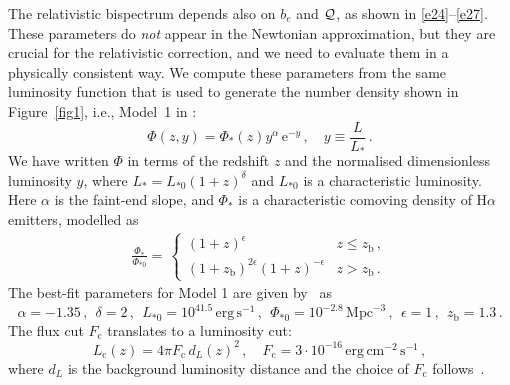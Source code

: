 The relativistic bispectrum depends also on $b_e$  and ${\cal Q}$, as shown in \eqref{e24}--\eqref{e27}.
These parameters do {\em not} appear in the Newtonian approximation, but they are crucial for the relativistic correction, and we need to evaluate them in a physically consistent way. We compute these parameters from the same luminosity function that is  used to generate the number density shown in Figure~\ref{fig1}, i.e., Model~1 in \cite{Pozzetti:2016cch}:
\begin{equation}
\Phi( z,y) = \Phi_{*}(z) y^\alpha\,{\mathrm{e}}^{-y}\,, \quad y\equiv \frac{L}{L_{*}}\,.
\label{e12_3}
\end{equation}
We have written $\Phi$ in terms of the redshift $z$ and the normalised dimensionless luminosity $y$, where $L_*=L_{*0}(1+z)^\delta$ and $L_{*0}$ is a characteristic luminosity. Here $\alpha$ is the faint-end slope, and $\Phi_{*}$ is a characteristic comoving density of H$\alpha$ emitters, modelled as 
\begin{align}\label{eq:comovinghamodel1}
\frac{\Phi_{*}}{\Phi_{*0}}= \,
\begin{cases} (1+z)^{\epsilon} &   z \leq z_{\mathrm{b}}\,,\\
(1+z_{\mathrm{b}})^{2\epsilon}(1+z)^{-\epsilon} & z > z_{\mathrm{b}} \,.
\end{cases}
\end{align}
The best-fit parameters for Model 1 are given by~\cite{Pozzetti:2016cch} as 
\begin{equation} \label{eucp}
\alpha=-1.35\,, ~~\delta=2\,,~~ L_{*0}=10^{41.5}\,\mathrm{erg\,s}^{-1}\,,~~\Phi_{*0}=10^{-2.8}\,\mathrm{Mpc}^{-3}\,,~~\epsilon=1\,,~~z_{\mathrm{b}}=1.3  \,. 
\end{equation}
The flux cut $F_{\mathrm{c}}$ translates to a luminosity cut:
 \begin{equation} \label{lc}
 L_{\mathrm{c}}(z)=4\pi F_{\mathrm{c}} \,d_L(z)^2\,,\quad F_{\mathrm{c}} =3\cdot10^{-16}\,\mathrm{erg\,cm^{-2}\,s^{-1}} \,,
 \end{equation}
where $d_L$ is the background luminosity distance and the choice of $F_{\mathrm{c}}$ follows~\cite{Yankelevich:2018uaz}. 
